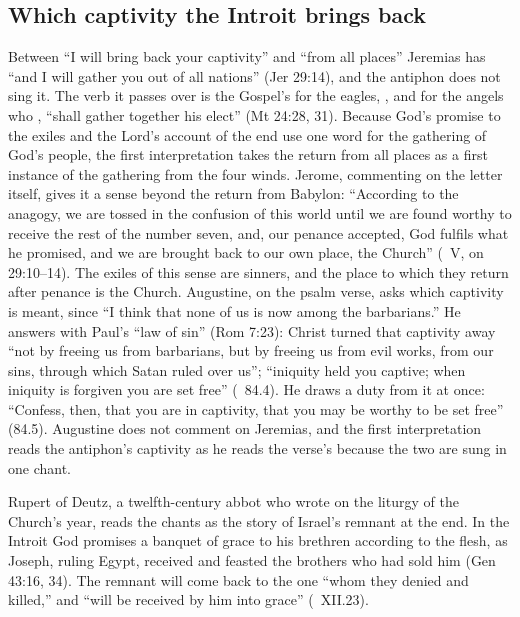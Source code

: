 \subsection{Which captivity the Introit brings back}

Between ``I will bring back your captivity'' and ``from all places'' Jeremias
has ``and I will gather you out of all nations'' (Jer 29:14), and the antiphon
does not sing it. The verb it passes over is the Gospel's for the eagles,
, and for the angels who , ``shall gather together his elect'' (Mt 24:28, 31). Because God's
promise to the exiles and the Lord's account of the end use one word for the
gathering of God's people, the first interpretation takes the return from all
places as a first instance of the gathering from the four winds. Jerome,
commenting on the letter itself, gives it a sense beyond the return from
Babylon: ``According to the anagogy, we are tossed in the confusion of this
world until we are found worthy to receive the rest of the number seven, and,
our penance accepted, God fulfils what he promised, and we are brought back
to our own place, the Church'' (~V, on 29:10--14). The
exiles of this sense are sinners, and the place to which they return after
penance is the Church. Augustine, on the psalm verse, asks which captivity is
meant, since ``I think that none of us is now among the barbarians.'' He
answers with Paul's ``law of sin'' (Rom 7:23): Christ turned that captivity
away ``not by freeing us from barbarians, but by freeing us from evil works,
from our sins, through which Satan ruled over us''; ``iniquity held you
captive; when iniquity is forgiven you are set free'' (~84.4). He draws a duty from it at once: ``Confess, then, that you
are in captivity, that you may be worthy to be set free'' (84.5). Augustine
does not comment on Jeremias, and the first interpretation reads the
antiphon's captivity as he reads the verse's because the two are sung in one
chant.

Rupert of Deutz, a twelfth-century abbot who wrote on the liturgy of the
Church's year, reads the chants as the story of Israel's remnant at the end.
In the Introit God promises a banquet of grace to his brethren according to
the flesh, as Joseph, ruling Egypt, received and feasted the brothers who had
sold him (Gen 43:16, 34). The remnant will come back to the one ``whom they
denied and killed,'' and ``will be received by him into grace''
(~XII.23).

